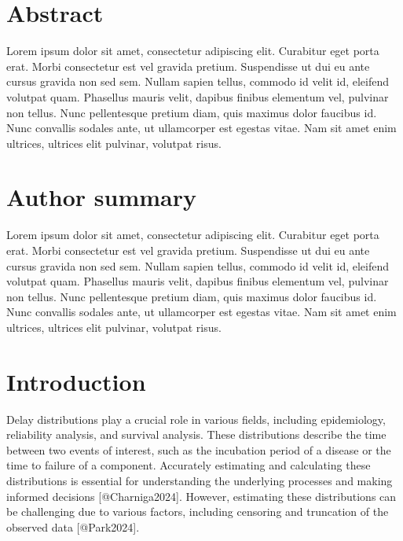 \documentclass[10pt,letterpaper]{article}
\begin{document}
\section*{Abstract}
Lorem ipsum dolor sit amet, consectetur adipiscing elit. Curabitur eget porta erat. Morbi consectetur est vel gravida pretium. Suspendisse ut dui eu ante cursus gravida non sed sem. Nullam sapien tellus, commodo id velit id, eleifend volutpat quam. Phasellus mauris velit, dapibus finibus elementum vel, pulvinar non tellus. Nunc pellentesque pretium diam, quis maximus dolor faucibus id. Nunc convallis sodales ante, ut ullamcorper est egestas vitae. Nam sit amet enim ultrices, ultrices elit pulvinar, volutpat risus.


\section*{Author summary}
Lorem ipsum dolor sit amet, consectetur adipiscing elit. Curabitur eget porta erat. Morbi consectetur est vel gravida pretium. Suspendisse ut dui eu ante cursus gravida non sed sem. Nullam sapien tellus, commodo id velit id, eleifend volutpat quam. Phasellus mauris velit, dapibus finibus elementum vel, pulvinar non tellus. Nunc pellentesque pretium diam, quis maximus dolor faucibus id. Nunc convallis sodales ante, ut ullamcorper est egestas vitae. Nam sit amet enim ultrices, ultrices elit pulvinar, volutpat risus.

\linenumbers

\section*{Introduction}

Delay distributions play a crucial role in various fields, including epidemiology, reliability analysis, and survival analysis. These distributions describe the time between two events of interest, such as the incubation period of a disease or the time to failure of a component. Accurately estimating and calculating these distributions is essential for understanding the underlying processes and making informed decisions [@Charniga2024]. However, estimating these distributions can be challenging due to various factors, including censoring and truncation of the observed data [@Park2024].
\end{document}
